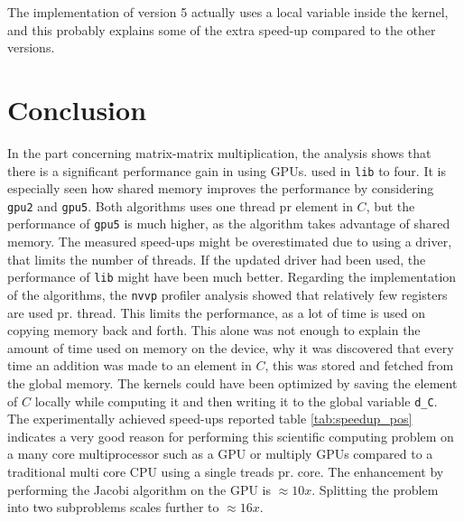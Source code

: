 \noindent The implementation of version 5 actually uses a local variable inside the kernel, and this probably explains some of the extra speed-up compared to the other versions.

\newpage





\newpage
\section{Conclusion}
In the part concerning matrix-matrix multiplication, the analysis shows that there is a significant performance gain in using GPUs. used in \texttt{lib} to four. It is especially seen how shared memory improves the performance by considering \texttt{gpu2} and \texttt{gpu5}. Both algorithms uses one thread pr element in $C$, but the performance of \texttt{gpu5} is much higher, as the algorithm takes advantage of shared memory. The measured speed-ups might be overestimated due to using a driver, that limits the number of threads. If the updated driver had been used, the performance of \texttt{lib} might have been much better. Regarding the implementation of the algorithms, the \texttt{nvvp} profiler analysis showed that relatively few registers are used pr. thread. This limits the performance, as a lot of time is used on copying memory back and forth. This alone was not enough to explain the amount of time used on memory on the device, why it was discovered that every time an addition was made to an element in $C$, this was stored and fetched from the global memory. The kernels could have been optimized by saving the element of $C$ locally while computing it and then writing it to the global variable \texttt{d\_C}. \\
The experimentally achieved speed-ups reported table \ref{tab:speedup_pos} indicates a very good reason for performing this scientific computing problem on a many core multiprocessor such as a GPU or multiply GPUs compared to a traditional multi core CPU using a single treads pr. core.
The enhancement by performing the Jacobi algorithm on the GPU is $\approx 10x$. Splitting the problem into two subproblems scales further to $\approx 16x$.